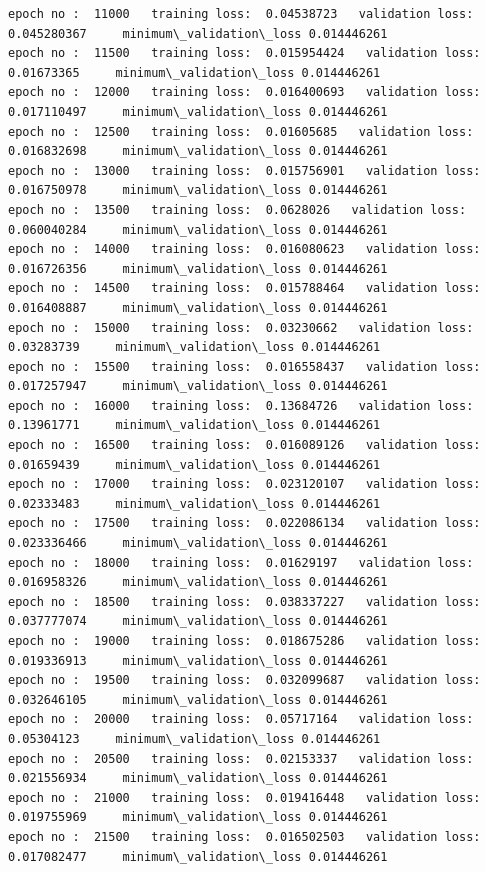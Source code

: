 \documentclass[11pt, a4paper , landscape]{article}
\begin{document}
\begin{Verbatim}[commandchars=\\\{\}]
epoch no :  11000   training loss:  0.04538723   validation loss:  0.045280367     minimum\_validation\_loss 0.014446261
epoch no :  11500   training loss:  0.015954424   validation loss:  0.01673365     minimum\_validation\_loss 0.014446261
epoch no :  12000   training loss:  0.016400693   validation loss:  0.017110497     minimum\_validation\_loss 0.014446261
epoch no :  12500   training loss:  0.01605685   validation loss:  0.016832698     minimum\_validation\_loss 0.014446261
epoch no :  13000   training loss:  0.015756901   validation loss:  0.016750978     minimum\_validation\_loss 0.014446261
epoch no :  13500   training loss:  0.0628026   validation loss:  0.060040284     minimum\_validation\_loss 0.014446261
epoch no :  14000   training loss:  0.016080623   validation loss:  0.016726356     minimum\_validation\_loss 0.014446261
epoch no :  14500   training loss:  0.015788464   validation loss:  0.016408887     minimum\_validation\_loss 0.014446261
epoch no :  15000   training loss:  0.03230662   validation loss:  0.03283739     minimum\_validation\_loss 0.014446261
epoch no :  15500   training loss:  0.016558437   validation loss:  0.017257947     minimum\_validation\_loss 0.014446261
epoch no :  16000   training loss:  0.13684726   validation loss:  0.13961771     minimum\_validation\_loss 0.014446261
epoch no :  16500   training loss:  0.016089126   validation loss:  0.01659439     minimum\_validation\_loss 0.014446261
epoch no :  17000   training loss:  0.023120107   validation loss:  0.02333483     minimum\_validation\_loss 0.014446261
epoch no :  17500   training loss:  0.022086134   validation loss:  0.023336466     minimum\_validation\_loss 0.014446261
epoch no :  18000   training loss:  0.01629197   validation loss:  0.016958326     minimum\_validation\_loss 0.014446261
epoch no :  18500   training loss:  0.038337227   validation loss:  0.037777074     minimum\_validation\_loss 0.014446261
epoch no :  19000   training loss:  0.018675286   validation loss:  0.019336913     minimum\_validation\_loss 0.014446261
epoch no :  19500   training loss:  0.032099687   validation loss:  0.032646105     minimum\_validation\_loss 0.014446261
epoch no :  20000   training loss:  0.05717164   validation loss:  0.05304123     minimum\_validation\_loss 0.014446261
epoch no :  20500   training loss:  0.02153337   validation loss:  0.021556934     minimum\_validation\_loss 0.014446261
epoch no :  21000   training loss:  0.019416448   validation loss:  0.019755969     minimum\_validation\_loss 0.014446261
epoch no :  21500   training loss:  0.016502503   validation loss:  0.017082477     minimum\_validation\_loss 0.014446261

\end{Verbatim}
\end{document}
